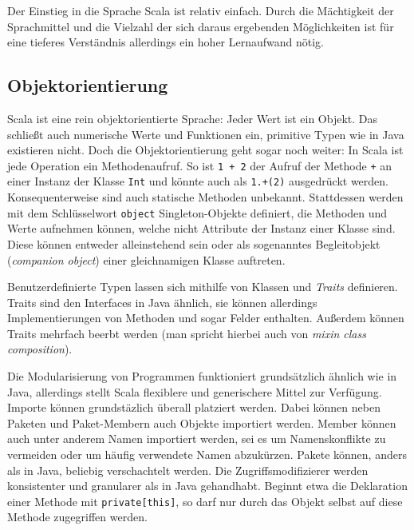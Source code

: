 \documentclass[a4paper, 12pt, hidelinks, listof=totoc, listoftables=totoc, bibliography=totoc]{scrreprt}
\begin{document}
Der Einstieg in die Sprache Scala ist relativ einfach. Durch die Mächtigkeit der Sprachmittel und die Vielzahl der sich daraus ergebenden Möglichkeiten ist für eine tieferes Verständnis allerdings ein hoher Lernaufwand nötig.



\subsection{Objektorientierung}

Scala ist eine rein objektorientierte Sprache: Jeder Wert ist ein Objekt. Das schließt auch numerische Werte und Funktionen ein, primitive Typen wie in Java existieren nicht. Doch die Objektorientierung geht sogar noch weiter: In Scala ist jede Operation ein Methodenaufruf. So ist \texttt{1 + 2} der Aufruf der Methode \texttt{+} an einer Instanz der Klasse \texttt{Int} und könnte auch als \texttt{1.+(2)} ausgedrückt werden. Konsequenterweise sind auch statische Methoden unbekannt. Stattdessen werden mit dem Schlüsselwort \texttt{object} Singleton-Objekte definiert, die Methoden und Werte aufnehmen können, welche nicht Attribute der Instanz einer Klasse sind. Diese können entweder alleinstehend sein oder als sogenanntes Begleitobjekt (\textit{companion object}) einer gleichnamigen Klasse auftreten.

Benutzerdefinierte Typen lassen sich mithilfe von Klassen und \textit{Traits} definieren. Traits sind den Interfaces in Java ähnlich, sie können allerdings Implementierungen von Methoden und sogar Felder enthalten. Außerdem können Traits mehrfach beerbt werden (man spricht hierbei auch von \textit{mixin class composition}).

Die Modularisierung von Programmen funktioniert grundsätzlich ähnlich wie in Java, allerdings stellt Scala flexiblere und generischere Mittel zur Verfügung. Importe können grundstäzlich überall platziert werden. Dabei können neben Paketen und Paket-Membern auch Objekte importiert werden. Member können auch unter anderem Namen importiert werden, sei es um Namenskonflikte zu vermeiden oder um häufig verwendete Namen abzukürzen.
Pakete können, anders als in Java, beliebig verschachtelt werden. Die Zugriffsmodifizierer werden konsistenter und granularer als in Java gehandhabt. Beginnt etwa die Deklaration einer Methode mit \texttt{private[this]}, so darf nur durch das Objekt selbst auf diese Methode zugegriffen werden.\cite[S. 9 f., S. 233 ff.]{odersky2008.PIS}\cite{scala-lang.ATS}
\end{document}
